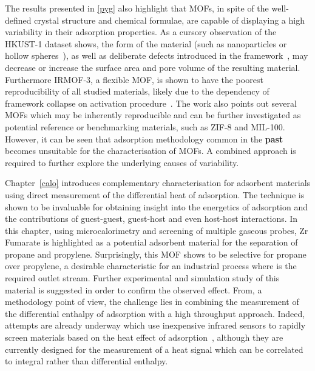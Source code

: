 The results presented in \autoref{pyg} also highlight that
\glspl{MOF}, in spite of the well-defined crystal structure and 
chemical formulae, are capable of displaying a high variability in
their adsorption properties. 
As a cursory observation of the HKUST-1 dataset shows, the form of the 
material (such as nanoparticles or hollow
spheres~\cite{liControllableSynthesisMetal2013}), as well as 
deliberate defects introduced in the 
framework~\cite{barinDefectCreationLinker2014}, may decrease or 
increase the surface area and pore volume of the resulting material.
Furthermore IRMOF-3, a flexible \gls{MOF}, 
is shown to have the poorest reproducibility of all studied materials,
likely due to the dependency of framework collapse on 
activation procedure~\cite{engelActivationDependentBreathingFlexible2017}.
The work also points out several \glspl{MOF} 
which may be inherently reproducible and can be further investigated as 
potential reference or benchmarking materials, such as 
ZIF-8 and MIL-100.
However, it can be seen that adsorption methodology common in the
\textbf{past} becomes unsuitable for the characterisation of \glspl{MOF}. 
A combined approach is required to further explore the underlying 
causes of variability.

Chapter~\ref{calo} introduces complementary characterisation 
for adsorbent materials using direct measurement of the
differential heat of adsorption. The technique is shown to be 
invaluable for obtaining insight into the energetics of 
adsorption and the contributions of guest-guest, guest-host 
and even host-host interactions. In this chapter,
using microcalorimetry and screening of multiple gaseous probes,
Zr Fumarate is highlighted as a potential adsorbent material for the 
separation of propane and propylene. Surprisingly, this \gls{MOF} shows
to be selective for propane over propylene, a desirable characteristic
for an industrial process where  is the required
outlet stream. Further experimental and simulation study of this
material is suggested in order to confirm the observed effect.
From, a methodology point of view, the challenge lies in combining
the measurement of the differential enthalpy of adsorption with a 
high throughput approach. 
Indeed, attempts are already underway which use inexpensive infrared 
sensors to rapidly screen materials based on the heat effect of 
adsorption~\cite{wollmannInfrasorbOpticalDetection2012}, although
they are currently designed for the measurement of a heat signal 
which can be correlated to integral rather than differential enthalpy.

